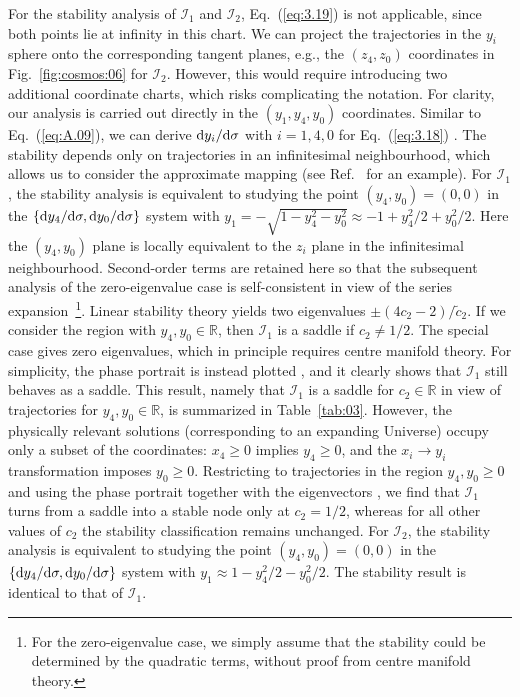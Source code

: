 \documentclass[aps,prd,twocolumn]{revtex4-2}
\newcommand\dx{{\rm d}}
\begin{document}
For the stability analysis of $\mathcal{I}_1$ and $\mathcal{I}_2$, Eq.~(\ref{eq:3.19}) is not applicable, since both points lie at infinity in this chart. We can project the trajectories in the $y_i$ sphere onto the corresponding tangent planes, e.g., the $(z_4,z_0)$ coordinates in Fig.~\ref{fig:cosmos:06} for $\mathcal{I}_2$. However, this would require introducing two additional coordinate charts, which risks complicating the notation. For clarity, our analysis is carried out directly in the $(y_1,y_4,y_0)$ coordinates. Similar to Eq.~(\ref{eq:A.09}), we can derive $\dx y_i/\dx\sigma$ with $i=1,4,0$ for Eq.~(\ref{eq:3.18}) \cite{NotShown}. The stability depends only on trajectories in an infinitesimal neighbourhood, which allows us to consider the approximate mapping (see Ref.~\cite{Lefschetz1957.book} for an example). For $\mathcal{I}_1$, the stability analysis is equivalent to studying the point $(y_4,y_0)=(0,0)$ in the $\{\dx y_4/\dx\sigma,\dx y_0/\dx\sigma\}$ system with $y_1=-\sqrt{1-y_4^2-y_0^2}\approx-1+y_4^2/2+y_0^2/2$. Here the $(y_4,y_0)$ plane is locally equivalent to the $z_i$ plane in the infinitesimal neighbourhood. Second-order terms are retained here so that the subsequent analysis of the zero-eigenvalue case is self-consistent in view of the series expansion~\footnote{For the zero-eigenvalue case, we simply assume that the stability could be determined by the quadratic terms, without proof from centre manifold theory.}. Linear stability theory yields two eigenvalues $\pm(4c_2-2)/\tilde{c}_2$. If we consider the region with $y_4,y_0\in\mathbb{R}$, then $\mathcal{I}_1$ is a saddle if $c_2\neq1/2$. The special case gives zero eigenvalues, which in principle requires centre manifold theory. For simplicity, the phase portrait is instead plotted \cite{NotShown}, and it clearly shows that $\mathcal{I}_1$ still behaves as a saddle. This result, namely that $\mathcal{I}_1$ is a saddle for $c_2\in\mathbb{R}$ in view of trajectories for $y_4,y_0\in\mathbb{R}$, is summarized in Table~\ref{tab:03}. However, the physically relevant solutions (corresponding to an expanding Universe) occupy only a subset of the coordinates: $x_4\geqslant0$ implies $y_4\geqslant0$, and the $x_i\rightarrow y_i$ transformation imposes $y_0\geqslant0$. Restricting to trajectories in the region $y_4,y_0\geqslant0$ and using the phase portrait together with the eigenvectors \cite{NotShown}, we find that $\mathcal{I}_1$ turns from a saddle into a stable node only at $c_2=1/2$, whereas for all other values of $c_2$ the stability classification remains unchanged. For $\mathcal{I}_2$, the stability analysis is equivalent to studying the point $(y_4,y_0)=(0,0)$ in the $\{\dx y_4/\dx\sigma,\dx y_0/\dx\sigma\}$ system with $y_1\approx1-y_4^2/2-y_0^2/2$. The stability result is identical to that of $\mathcal{I}_1$.
\end{document}
